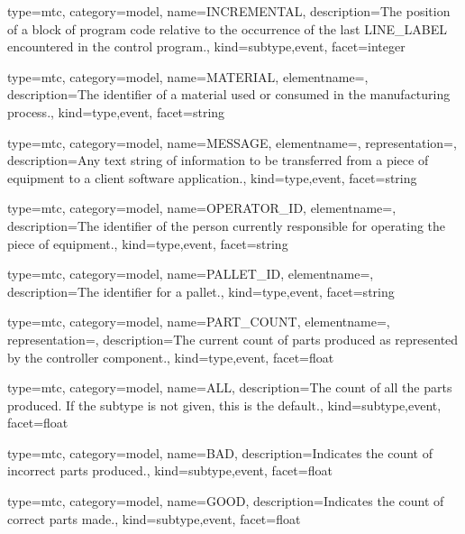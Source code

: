 {
  type=mtc,
  category=model,
  name={INCREMENTAL},
  description={The position of a block of program code relative to the occurrence of the last LINE\_LABEL encountered in the control program.},
  kind={subtype,event},
  facet={\gls{integer}}
}


{
  type=mtc,
  category=model,
  name={MATERIAL},
  elementname=,
  description={The identifier of a material used or consumed in the manufacturing process.},
  kind={type,event},
  facet={\gls{string}}
}


{
  type=mtc,
  category=model,
  name={MESSAGE},
  elementname=,
  representation=,
  description={Any text string of information to be transferred from a piece of equipment to a client software application.},
  kind={type,event},
  facet={\gls{string}}
}


{
  type=mtc,
  category=model,
  name={OPERATOR\_ID},
  elementname=,
  description={The identifier of the person currently responsible for operating the piece of equipment.},
  kind={type,event},
  facet={\gls{string}}
}


{
  type=mtc,
  category=model,
  name={PALLET\_ID},
  elementname=,
  description={The identifier for a pallet.},
  kind={type,event},
  facet={\gls{string}}
}


{
  type=mtc,
  category=model,
  name={PART\_COUNT},
  elementname=,
  representation=,
  description={The current count of parts produced as represented by the \gls{controller} component.},
  kind={type,event},
  facet={\gls{float}}
}


{
  type=mtc,
  category=model,
  name={ALL},
  description={The count of all the parts produced.  If the subtype is not given, this is the default.},
  kind={subtype,event},
  facet={\gls{float}}
}


{
  type=mtc,
  category=model,
  name={BAD},
  description={Indicates the count of incorrect parts produced.},
  kind={subtype,event},
  facet={\gls{float}}
}


{
  type=mtc,
  category=model,
  name={GOOD},
  description={Indicates the count of correct parts made.},
  kind={subtype,event},
  facet={\gls{float}}
}


